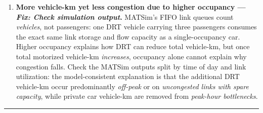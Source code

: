 \documentclass[preprint,12pt,authoryear]{elsarticle}
\begin{document}
\begin{enumerate}
  \item \textbf{More vehicle-km yet less congestion due to higher occupancy --- \textit{Fix: Check simulation output}.}
    MATSim's FIFO link queues count \emph{vehicles}, not passengers: one DRT vehicle carrying three passengers consumes the exact same link storage and flow capacity as a single-occupancy car.
    Higher occupancy explains how DRT can reduce total vehicle-km, but once total motorized vehicle-km \emph{increases}, occupancy alone cannot explain why congestion falls.
    Check the MATSim outputs split by time of day and link utilization: the model-consistent explanation is that the additional DRT vehicle-km occur predominantly \emph{off-peak} or on \emph{uncongested links with spare capacity}, while private car vehicle-km are removed from \emph{peak-hour bottlenecks}.
\end{enumerate}
\hrule
\vspace{6pt}
\endgroup
\fi
\end{document}
